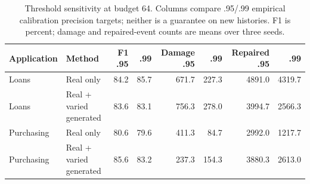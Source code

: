 \begin{table}[t]
\centering\small
\caption{Threshold sensitivity at budget 64. Columns compare .95/.99 empirical calibration precision targets; neither is a guarantee on new histories. F1 is percent; damage and repaired-event counts are means over three seeds.}
\label{tab:reliability}
\begin{tabular}{llrrrrrr}
\toprule
Application & Method & F1 .95 & .99 & Damage .95 & .99 & Repaired .95 & .99 \\
\midrule
Loans & Real only & 84.2 & 85.7 & 671.7 & 227.3 & 4891.0 & 4319.7 \\
Loans & Real + varied generated & 83.6 & 83.1 & 756.3 & 278.0 & 3994.7 & 2566.3 \\
Purchasing & Real only & 80.6 & 79.6 & 411.3 & 84.7 & 2992.0 & 1217.7 \\
Purchasing & Real + varied generated & 85.6 & 83.2 & 237.3 & 154.3 & 3880.3 & 2613.0 \\
\bottomrule
\end{tabular}
\end{table}
